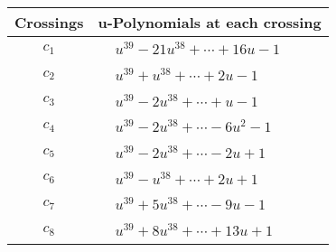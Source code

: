 \documentclass[1p]{elsarticle_modified}
\theoremstyle{definition}
\begin{document}
\begin{tabular}{m{50pt}|m{274pt}}
Crossings & \hspace{64pt}u-Polynomials at each crossing \\
\hline $$\begin{aligned}c_{1}\end{aligned}$$&$\begin{aligned}
&u^{39}-21 u^{38}+\cdots+16 u-1
\end{aligned}$\\
\hline $$\begin{aligned}c_{2}\end{aligned}$$&$\begin{aligned}
&u^{39}+u^{38}+\cdots+2 u-1
\end{aligned}$\\
\hline $$\begin{aligned}c_{3}\end{aligned}$$&$\begin{aligned}
&u^{39}-2 u^{38}+\cdots+u-1
\end{aligned}$\\
\hline $$\begin{aligned}c_{4}\end{aligned}$$&$\begin{aligned}
&u^{39}-2 u^{38}+\cdots-6 u^2-1
\end{aligned}$\\
\hline $$\begin{aligned}c_{5}\end{aligned}$$&$\begin{aligned}
&u^{39}-2 u^{38}+\cdots-2 u+1
\end{aligned}$\\
\hline $$\begin{aligned}c_{6}\end{aligned}$$&$\begin{aligned}
&u^{39}- u^{38}+\cdots+2 u+1
\end{aligned}$\\
\hline $$\begin{aligned}c_{7}\end{aligned}$$&$\begin{aligned}
&u^{39}+5 u^{38}+\cdots-9 u-1
\end{aligned}$\\
\hline $$\begin{aligned}c_{8}\end{aligned}$$&$\begin{aligned}
&u^{39}+8 u^{38}+\cdots+13 u+1
\end{aligned}$\\

\end{tabular}
\end{document}
